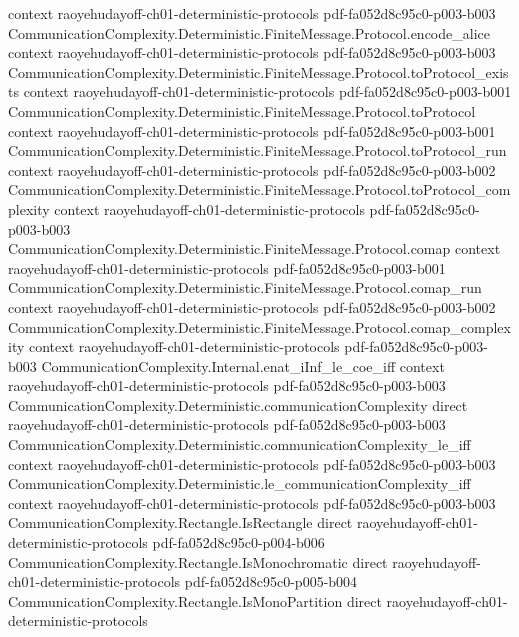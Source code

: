 \begin{theorem}
  {context}
  {raoyehudayoff-ch01-deterministic-protocols}
  {pdf-fa052d8c95c0-p003-b003}
\proofstep
  {CommunicationComplexity.Deterministic.FiniteMessage.Protocol.encode_alice}
  {context}
  {raoyehudayoff-ch01-deterministic-protocols}
  {pdf-fa052d8c95c0-p003-b003}
\proofstep
  {CommunicationComplexity.Deterministic.FiniteMessage.Protocol.toProtocol_exists}
  {context}
  {raoyehudayoff-ch01-deterministic-protocols}
  {pdf-fa052d8c95c0-p003-b001}
\proofstep
  {CommunicationComplexity.Deterministic.FiniteMessage.Protocol.toProtocol}
  {context}
  {raoyehudayoff-ch01-deterministic-protocols}
  {pdf-fa052d8c95c0-p003-b001}
\proofstep
  {CommunicationComplexity.Deterministic.FiniteMessage.Protocol.toProtocol_run}
  {context}
  {raoyehudayoff-ch01-deterministic-protocols}
  {pdf-fa052d8c95c0-p003-b002}
\proofstep
  {CommunicationComplexity.Deterministic.FiniteMessage.Protocol.toProtocol_complexity}
  {context}
  {raoyehudayoff-ch01-deterministic-protocols}
  {pdf-fa052d8c95c0-p003-b003}
\proofstep
  {CommunicationComplexity.Deterministic.FiniteMessage.Protocol.comap}
  {context}
  {raoyehudayoff-ch01-deterministic-protocols}
  {pdf-fa052d8c95c0-p003-b001}
\proofstep
  {CommunicationComplexity.Deterministic.FiniteMessage.Protocol.comap_run}
  {context}
  {raoyehudayoff-ch01-deterministic-protocols}
  {pdf-fa052d8c95c0-p003-b002}
\proofstep
  {CommunicationComplexity.Deterministic.FiniteMessage.Protocol.comap_complexity}
  {context}
  {raoyehudayoff-ch01-deterministic-protocols}
  {pdf-fa052d8c95c0-p003-b003}
\proofstep
  {CommunicationComplexity.Internal.enat_iInf_le_coe_iff}
  {context}
  {raoyehudayoff-ch01-deterministic-protocols}
  {pdf-fa052d8c95c0-p003-b003}
\proofstep
  {CommunicationComplexity.Deterministic.communicationComplexity}
  {direct}
  {raoyehudayoff-ch01-deterministic-protocols}
  {pdf-fa052d8c95c0-p003-b003}
\proofstep
  {CommunicationComplexity.Deterministic.communicationComplexity_le_iff}
  {context}
  {raoyehudayoff-ch01-deterministic-protocols}
  {pdf-fa052d8c95c0-p003-b003}
\proofstep
  {CommunicationComplexity.Deterministic.le_communicationComplexity_iff}
  {context}
  {raoyehudayoff-ch01-deterministic-protocols}
  {pdf-fa052d8c95c0-p003-b003}
\proofstep
  {CommunicationComplexity.Rectangle.IsRectangle}
  {direct}
  {raoyehudayoff-ch01-deterministic-protocols}
  {pdf-fa052d8c95c0-p004-b006}
\proofstep
  {CommunicationComplexity.Rectangle.IsMonochromatic}
  {direct}
  {raoyehudayoff-ch01-deterministic-protocols}
  {pdf-fa052d8c95c0-p005-b004}
\proofstep
  {CommunicationComplexity.Rectangle.IsMonoPartition}
  {direct}
  {raoyehudayoff-ch01-deterministic-protocols}

\end{theorem}
